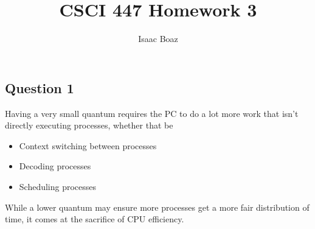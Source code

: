 \documentclass{article}
\author{Isaac Boaz}
\title{CSCI 447 Homework 3}
\begin{document}
\maketitle

\subsection*{Question 1}
Having a very small quantum requires the PC to do a lot more work that isn't
directly executing processes, whether that be
\begin{itemize}
    \item Context switching between processes
    \item Decoding processes
    \item Scheduling processes
\end{itemize}

While a lower quantum may ensure more processes get a more fair distribution of
time, it comes at the sacrifice of CPU efficiency.
\end{document}

